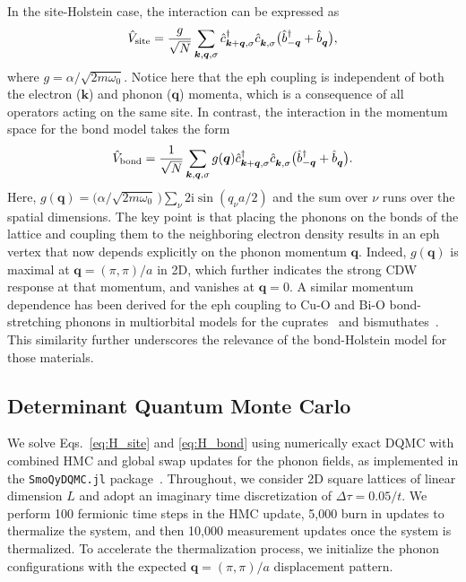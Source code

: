 \documentclass[%
reprint,
superscriptaddress,
nofootinbib,
twocolumn,
amsmath,amssymb,
aps,
prb,
]{revtex4-2}
\begin{document}
In the site-Holstein case, the interaction can be expressed as
\begin{eqnarray}
\hat V_{\rm site} = \frac{g}{\sqrt{N}} \sum_{\boldsymbol{k},\boldsymbol{q},\sigma}\hat c^{\dagger}_{\boldsymbol{k}+\boldsymbol{q},\sigma} \hat c^{\phantom{\dagger}}_{\boldsymbol{k},\sigma}\big( \hat b^{\dagger}_{-\boldsymbol{q}}+ \hat b^{\phantom{\dagger}}_{\boldsymbol{q}}\big),
\label{eq:siteKspace}
\end{eqnarray}
where $g= \alpha / \sqrt{2 m \omega_0}$. Notice here that the \gls*{eph} coupling 
is independent of both the electron ($\boldsymbol{k}$) and phonon ($\boldsymbol{q}$) momenta, which is a consequence of all operators acting on the same site. In contrast, the interaction in the momentum space for the bond model takes the form~\cite{Slezak2006}
\begin{eqnarray}
\hat V_{\rm bond} = \frac{1}{\sqrt{N}} \sum_{\boldsymbol{k},\boldsymbol{q},\sigma} g(\boldsymbol{q})
\hat c^{\dagger}_{\boldsymbol{k}+\boldsymbol{q},\sigma} \hat c^{\phantom{\dagger}}_{\boldsymbol{k},\sigma}\big(\hat b^{\dagger}_{-\boldsymbol{q}} +\hat b^{\phantom{\dagger}}_{\boldsymbol{q}}\big).
\label{eq:bondKspace}
\end{eqnarray}
Here, $g(\boldsymbol{q}) = \big( \alpha / \sqrt{2 m \omega_0} \, \big)\sum_\nu 2\mathrm{i}\sin\left(q_\nu a/2\right)$ and the sum over $\nu$ runs over the spatial dimensions. The key point is that placing the phonons on the bonds of the lattice and coupling them to the neighboring electron density results in an \gls*{eph} vertex that now depends explicitly on the phonon momentum $\boldsymbol{q}$. Indeed, $g(\boldsymbol{q})$ is maximal at $\boldsymbol{q}=(\pi,\pi)/a$ in 2D, which further indicates the strong \gls*{CDW} response at that momentum, and vanishes at $\boldsymbol{q}=0$. A similar momentum dependence has been derived for the \gls*{eph} coupling to Cu-O and Bi-O bond-stretching phonons in multiorbital models for the cuprates~\cite{Rosch2004electron, Johnston2010systematic} and bismuthates~\cite{CohenStead2023hybrid}. This similarity further underscores the relevance of the bond-Holstein model for those materials.

\subsection{Determinant Quantum Monte Carlo}\label{sec:DQMC}

We solve Eqs.~\eqref{eq:H_site} and \eqref{eq:H_bond} using numerically exact \gls*{DQMC} with combined \gls*{HMC} and global swap updates for the phonon fields, as implemented in the \texttt{SmoQyDQMC.jl} package~\cite{SmoqyDQMC1, SmoqyDQMC2}. Throughout, we consider \gls*{2D} square lattices of linear dimension $L$ and adopt an imaginary time discretization of $\Delta\tau = 0.05/t$. We perform 100 fermionic time steps in the \gls*{HMC} update, 5,000 burn in updates to thermalize the system, and then 10,000 measurement updates once the system is thermalized. To accelerate the thermalization process, we initialize the phonon configurations with the expected $\boldsymbol{q}=(\pi,\pi)/a$ displacement pattern.
\end{document}
